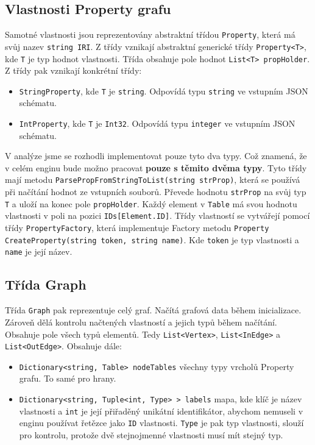 \subsection{Vlastnosti Property grafu}

Samotné vlastnosti jsou reprezentovány abstraktní třídou \texttt{Property}, která má svůj nazev \texttt{string IRI}.
Z třídy vznikají abstraktní generické třídy \texttt{Property<T>}, kde \texttt{T} je typ hodnot vlastnosti.
Třída obsahuje pole hodnot \texttt{List<T> propHolder}.
Z třídy pak vznikají konkrétní třídy:
\begin{itemize}
\item \texttt{StringProperty}, kde \texttt{T} je \texttt{string}. Odpovídá typu \texttt{string} ve vstupním JSON schématu.
\item \texttt{IntProperty}, kde \texttt{T} je \texttt{Int32}. Odpovídá typu \texttt{integer} ve vstupním JSON schématu.
\end{itemize}
V analýze jsme se rozhodli implementovat pouze tyto dva typy. 
Což znamená, že v celém enginu bude možno pracovat \textbf{pouze s těmito dvěma typy}.
Tyto třídy mají metodu \texttt{ParsePropFromStringToList(string strProp)}, která se používá při načítání hodnot ze vstupních souborů.
Převede hodnotu \texttt{strProp} na svůj typ \texttt{T} a uloží na konec pole \texttt{propHolder}.
Každý element v \texttt{Table} má svou hodnotu vlastnosti v poli na pozici \texttt{IDs[Element.ID]}.
Třídy vlastností se vytvářejí pomocí třídy \texttt{PropertyFactory}, která implementuje Factory metodu \citep[str. 107]{patterns} \texttt{Property CreateProperty(string token, string name)}.
Kde \texttt{token} je typ vlastnosti a \texttt{name} je její název.

\subsection{Třída Graph}
Třída \texttt{Graph} pak reprezentuje celý graf.
Načítá grafová data během inicializace.
Zároveň dělá kontrolu načtených vlastností a jejich typů během načítání.
Obsahuje pole všech typů elementů. Tedy \texttt{List<Vertex>}, \texttt{List<InEdge>} a \texttt{List<OutEdge>}.
Obsahuje dále:
\begin{itemize}
\item \texttt{Dictionary<string, Table> nodeTables} všechny typy vrcholů Property grafu. To samé pro hrany.
\item \texttt{Dictionary<string, Tuple<int, Type> > labels} mapa, kde klíč je název vlastnosti a \texttt{int} je její přiřaděný unikátní identifikátor, abychom nemuseli v enginu používat řetězce jako \texttt{ID} vlastnosti.
\texttt{Type} je pak typ vlastnosti, slouží pro kontrolu, protože dvě stejnojmenné vlastnosti musí mít stejný typ. 
\end{itemize}

